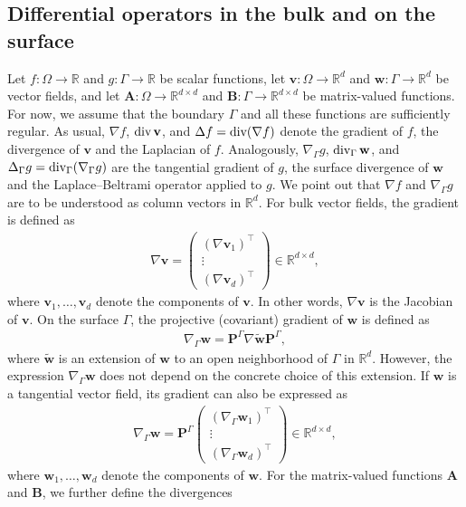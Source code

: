 \documentclass[11pt,reqno]{amsart}
\theoremstyle{remark}
\numberwithin{equation}{section}
\newcommand{\R}{\mathbb R}
\newcommand{\Grad}{\nabla}
\newcommand{\Lap}{\Delta}
\newcommand{\Div}{\textnormal{div}}
\newcommand{\Gradg}{\nabla_\Ga}
\newcommand{\Lapg}{\Delta_\Ga}
\newcommand{\Divg}{\textnormal{div}_\Ga}
\newcommand{\Ga}{\Gamma}
\newcommand{\bv}{\mathbf v}
\newcommand{\bw}{\mathbf w}
\newcommand{\tw}{\widetilde{\bw}}
\begin{document}
\subsection{Differential operators in the bulk and on the surface} \label{NOT:DIFFOP}
Let $f:\Omega\to\R$ and $g:\Gamma\to\R$ be scalar functions, let $\bv:\Omega\to \R^d$ and $\bw:\Gamma\to\R^d$ be vector fields, and let $\mathbf{A}:\Omega\to\R^{d\times d}$ and $\mathbf{B}:\Gamma\to\R^{d\times d}$ be matrix-valued functions. 
For now, we assume that the boundary $\Gamma$ and all these functions are sufficiently regular.
As usual, $\Grad f$, $\Div\,\bv$, and $\Lap f = \Div(\Grad f)$ denote the gradient of $f$, the divergence of $\bv$ and the Laplacian of $f$. 
Analogously, $\Gradg g$, $\Divg\,\bw$, and $\Lapg g = \Divg(\Gradg g)$ are the tangential gradient of $g$, the surface divergence of $\bw$ and the Laplace--Beltrami operator applied to $g$. 
We point out that $\Grad f$ and $\Gradg g$ are to be understood as column vectors in $\R^d$.
For bulk vector fields, the gradient is defined as
\begin{align*}
    \Grad \bv = 
    \begin{pmatrix}
        (\Grad \bv_1)^\top \\ \vdots \\ (\Grad \bv_d)^\top
    \end{pmatrix}
    \in \R^{d\times d},
\end{align*}
where $\bv_1,\ldots,\bv_d$ denote the components of $\bv$. In other words, $\Grad\bv$ is the Jacobian of $\bv$. On the surface $\Gamma$, the projective (covariant) gradient of $\bw$ is defined as 
\begin{align*}
    \Gradg\bw = \mathbf{P}^\Gamma \Grad\tw \mathbf{P}^\Gamma,
\end{align*}
where $\tw$ is an extension of $\bw$ to an open neighborhood of $\Gamma$ in $\R^d$. However, the expression $\Gradg\bw$ does not depend on the concrete choice of this extension. If $\bw$ is a tangential vector field, its gradient can also be expressed as
\begin{align*}
    \Gradg \bw = \mathbf{P}^\Gamma
    \begin{pmatrix}
        (\Gradg \bw_1)^\top \\ \vdots \\ (\Gradg \bw_d)^\top
    \end{pmatrix}
    \in \R^{d\times d},
\end{align*}
where $\bw_1,\ldots,\bw_d$ denote the components of $\bw$.  
For the matrix-valued functions $\mathbf{A}$ and $\mathbf{B}$, we further define the divergences
\end{document}
